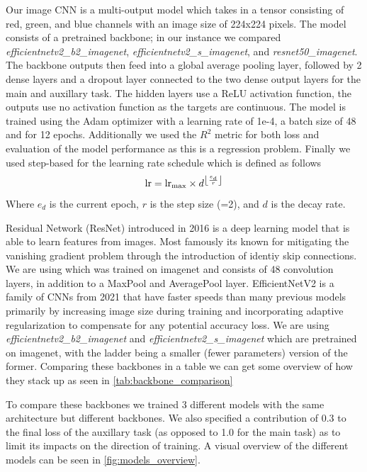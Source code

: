 \documentclass[12pt,a4paper,oneside]{article}
\begin{document}
Our image CNN is a multi-output model which takes in a tensor consisting of red, green, and blue channels with an image size of 224x224 pixels. The model consists of a pretrained backbone; in our instance we compared \textit{efficientnetv2\_b2\_imagenet}, \textit{efficientnetv2\_s\_imagenet}, and \textit{resnet50\_imagenet}. The backbone outputs then feed into a global average pooling layer, followed by 2 dense layers and a dropout layer connected to the two dense output layers for the main and auxillary task. The hidden layers use a ReLU activation function, the outputs use no activation function as the targets are continuous. The model is trained using the Adam optimizer with a learning rate of 1e-4, a batch size of 48 and for 12 epochs. Additionally we used the $R^2$ metric for both loss and evaluation of the model performance as this is a regression problem. Finally we used step-based for the learning rate schedule which is defined as follows
\[
    \text{lr} = \text{lr}_\text{max} \times d^{\floor*{\frac{e_d}{r}}}
\]
Where $e_d$ is the current epoch, $r$ is the step size (=2), and $d$ is the decay rate.

\smallskip
Residual Network (ResNet) \cite{he2016identity} introduced in 2016 is a deep learning model that is able to learn features from images. Most famously its known for mitigating the vanishing gradient problem through the introduction of identiy skip connections. We are using  which was trained on imagenet and consists of 48 convolution layers, in addition to a MaxPool and AveragePool layer. EfficientNetV2 \cite{tan2021efficientnetv2} is a family of CNNs from 2021 that have faster speeds than many previous models primarily by increasing image size during training and incorporating adaptive regularization to compensate for any potential accuracy loss. We are using \textit{efficientnetv2\_b2\_imagenet} and \textit{efficientnetv2\_s\_imagenet} which are pretrained on imagenet, with the ladder being a smaller (fewer parameters) version of the former. Comparing these backbones in a table we can get some overview of how they stack up as seen in \ref{tab:backbone_comparison}

To compare these backbones we trained 3 different models with the same architecture but different backbones. We also specified a contribution of 0.3 to the final loss of the auxillary task (as opposed to 1.0 for the main task) as to limit its impacts on the direction of training. A visual overview of the different models can be seen in \ref{fig:models_overview}. 
\end{document}
